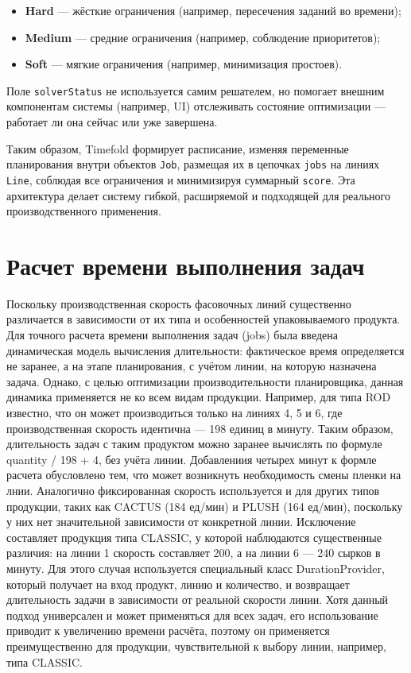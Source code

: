 \begin{itemize}
    \item \textbf{Hard} — жёсткие ограничения (например, пересечения заданий во времени);
    \item \textbf{Medium} — средние ограничения (например, соблюдение приоритетов);
    \item \textbf{Soft} — мягкие ограничения (например, минимизация простоев).
\end{itemize}

Поле \texttt{solverStatus} не используется самим решателем, но помогает внешним компонентам системы (например, UI) отслеживать состояние оптимизации — работает ли она сейчас или уже завершена.

\vspace{1em}

Таким образом, Timefold формирует расписание, изменяя переменные планирования внутри объектов \texttt{Job}, размещая их в цепочках \texttt{jobs} на линиях \texttt{Line}, соблюдая все ограничения и минимизируя суммарный \texttt{score}. Эта архитектура делает систему гибкой, расширяемой и подходящей для реального производственного применения.

\section{Расчет времени выполнения задач}

Поскольку производственная скорость фасовочных линий существенно различается в зависимости от их типа и особенностей упаковываемого продукта. Для точного расчета времени выполнения задач (jobs) была введена динамическая модель вычисления длительности: фактическое время определяется не заранее, а на этапе планирования, с учётом линии, на которую назначена задача. Однако, с целью оптимизации производительности планировщика, данная динамика применяется не ко всем видам продукции. Например, для типа ROD известно, что он может производиться только на линиях 4, 5 и 6, где производственная скорость идентична — 198 единиц в минуту. Таким образом, длительность задач с таким продуктом можно заранее вычислять по формуле quantity / 198 + 4, без учёта линии. Добавлениия четырех минут к формле расчета обусловлено тем, что может возникнуть необходимость смены пленки на лнии. Аналогично фиксированная скорость используется и для других типов продукции, таких как CACTUS (184 ед/мин) и PLUSH (164 ед/мин), поскольку у них нет значительной зависимости от конкретной линии. Исключение составляет продукция типа CLASSIC, у которой наблюдаются существенные различия: на линии 1 скорость составляет 200, а на линии 6 — 240 сырков в минуту. Для этого случая используется специальный класс DurationProvider, который получает на вход продукт, линию и количество, и возвращает длительность задачи в зависимости от реальной скорости линии. Хотя данный подход универсален и может применяться для всех задач, его использование приводит к увеличению времени расчёта, поэтому он применяется преимущественно для продукции, чувствительной к выбору линии, например, типа CLASSIC.

